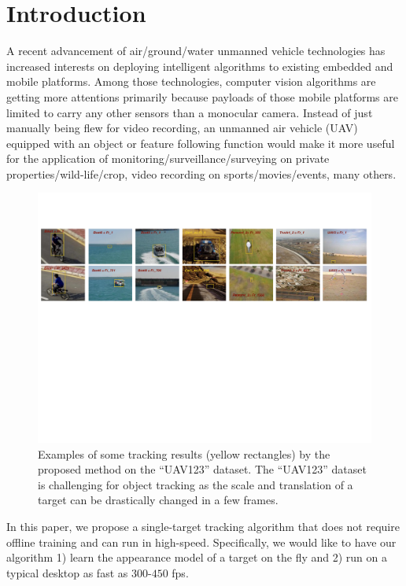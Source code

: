 \documentclass[10pt,twocolumn,letterpaper]{article}
\begin{document}
\section{Introduction}
\label{introduction}
A recent advancement of air/ground/water unmanned vehicle technologies
has increased interests on deploying intelligent algorithms to
existing embedded and mobile platforms. Among those technologies,
computer vision algorithms are getting more attentions primarily
because payloads of those mobile platforms are limited to carry any
other sensors than a monocular camera. Instead of just manually being
flew for video recording, an unmanned air vehicle (UAV) equipped with
an object or feature following function would make it more useful for
the application of monitoring/surveillance/surveying on private
properties/wild-life/crop, video recording on sports/movies/events,
many others.

\begin{figure}[!h]
\centering
\includegraphics[width=\textwidth]{./figures/ResultsIntroduction.pdf}
\caption{Examples of some tracking results (yellow rectangles) by the
  proposed method on the ``UAV123'' dataset. The ``UAV123'' dataset is
  challenging for object tracking as the scale and translation of a
  target can be drastically changed in a few frames.}
\label{ResultsIntroduction}
\end{figure}

In this paper, we propose a single-target tracking algorithm that does
not require offline training and can run in high-speed. Specifically, 
we would like to have our algorithm 1) learn
the appearance model of a target on the fly and 2) run on a
typical desktop as fast as $300$-$450$ fps.
\end{document}
